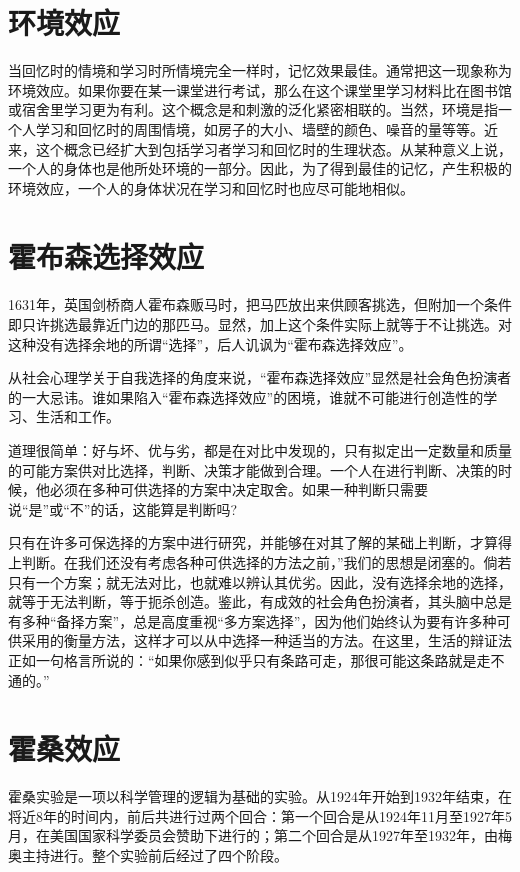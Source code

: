 \documentclass[11pt]{ctexart}
\begin{document}
\section{环境效应}
\label{sec-47}


当回忆时的情境和学习时所情境完全一样时，记忆效果最佳。通常把这一现象称为环境效应。如果你要在某一课堂进行考试，那么在这个课堂里学习材料比在图书馆或宿舍里学习更为有利。这个概念是和刺激的泛化紧密相联的。当然，环境是指一个人学习和回忆时的周围情境，如房子的大小、墙壁的颜色、噪音的量等等。近来，这个概念已经扩大到包括学习者学习和回忆时的生理状态。从某种意义上说，一个人的身体也是他所处环境的一部分。因此，为了得到最佳的记忆，产生积极的环境效应，一个人的身体状况在学习和回忆时也应尽可能地相似。
\section{霍布森选择效应}
\label{sec-48}


1631年，英国剑桥商人霍布森贩马时，把马匹放出来供顾客挑选，但附加一个条件即只许挑选最靠近门边的那匹马。显然，加上这个条件实际上就等于不让挑选。对这种没有选择余地的所谓“选择”，后人讥讽为“霍布森选择效应”。

从社会心理学关于自我选择的角度来说，“霍布森选择效应”显然是社会角色扮演者的一大忌讳。谁如果陷入“霍布森选择效应”的困境，谁就不可能进行创造性的学习、生活和工作。

道理很简单：好与坏、优与劣，都是在对比中发现的，只有拟定出一定数量和质量的可能方案供对比选择，判断、决策才能做到合理。一个人在进行判断、决策的时候，他必须在多种可供选择的方案中决定取舍。如果一种判断只需要说“是”或“不”的话，这能算是判断吗?

只有在许多可保选择的方案中进行研究，并能够在对其了解的某础上判断，才算得上判断。在我们还没有考虑各种可供选择的方法之前，”我们的思想是闭塞的。倘若只有一个方案；就无法对比，也就难以辨认其优劣。因此，没有选择余地的选择，就等于无法判断，等于扼杀创造。鉴此，有成效的社会角色扮演者，其头脑中总是有多种“备择方案”，总是高度重视“多方案选择”，因为他们始终认为要有许多种可供采用的衡量方法，这样才可以从中选择一种适当的方法。在这里，生活的辩证法正如一句格言所说的：“如果你感到似乎只有条路可走，那很可能这条路就是走不通的。”
\section{霍桑效应}
\label{sec-49}


霍桑实验是一项以科学管理的逻辑为基础的实验。从1924年开始到1932年结束，在将近8年的时间内，前后共进行过两个回合：第一个回合是从1924年11月至1927年5月，在美国国家科学委员会赞助下进行的；第二个回合是从1927年至1932年，由梅奥主持进行。整个实验前后经过了四个阶段。
\end{document}
